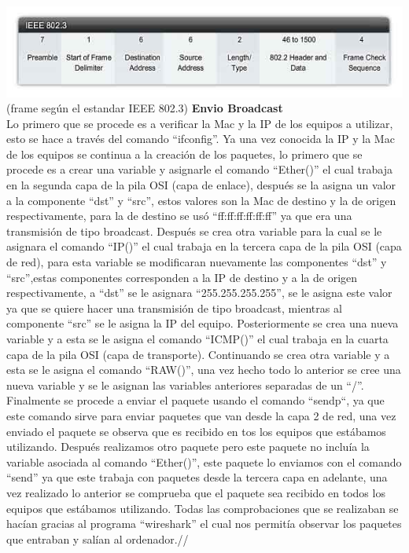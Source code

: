 \documentclass{udpreport}
\begin{document}
		\includegraphics[width=\textwidth]{frame.jpg}\\
		(frame según el estandar IEEE 802.3)
		{\bf Envio Broadcast}\\
		Lo primero que se procede es a verificar la Mac y la IP de los  equipos a utilizar, esto se hace a través del comando “ifconfig”. Ya una vez conocida la IP y la Mac de los equipos se continua a la creación de los paquetes, lo primero que se procede es a crear una variable y asignarle el comando  “Ether()” el cual trabaja en la segunda capa de la pila OSI (capa de enlace), después se la asigna un valor a la componente “dst” y “src”, estos valores son la Mac de destino y la de origen respectivamente, para la de destino se usó “ff:ff:ff:ff:ff:ff” ya que era una transmisión de tipo broadcast. Después se crea otra variable para la cual se le asignara el comando “IP()” el cual trabaja en la tercera capa de la pila OSI (capa de red), para esta variable se modificaran nuevamente las componentes “dst” y “src”,estas componentes corresponden a la IP de destino y a la de origen respectivamente, a “dst” se le asignara “255.255.255.255”, se le asigna este valor ya que se quiere hacer una transmisión de tipo broadcast, mientras al componente “src” se le asigna la IP del equipo. Posteriormente se crea una nueva variable y a esta se le asigna el comando “ICMP()” el cual trabaja en la cuarta capa de la pila OSI (capa de transporte). Continuando se crea otra variable y a esta se le asigna el comando “RAW()”, una vez hecho todo lo anterior se cree una nueva variable y se le asignan las variables anteriores separadas de un “/”. Finalmente se procede a enviar el paquete usando el comando “sendp“, ya que este comando sirve para enviar paquetes que van desde la capa 2 de red, una vez enviado el paquete se observa que es recibido en tos los equipos que estábamos utilizando. Después realizamos otro paquete pero este paquete no incluía la variable asociada al comando “Ether()”, este paquete lo enviamos con el comando “send” ya que este trabaja con paquetes desde la tercera capa en adelante, una vez realizado lo anterior se comprueba que el paquete sea recibido en todos los equipos que estábamos utilizando. Todas las comprobaciones que se realizaban se hacían gracias al programa “wireshark” el cual nos permitía observar los paquetes que entraban y salían al ordenador.//
\end{document}
